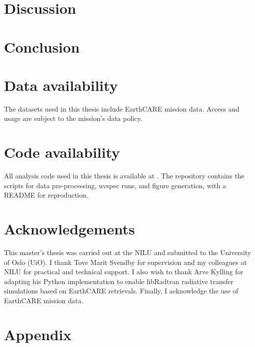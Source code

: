 \documentclass[]{Front_Page_UiO/uiomasterthesis}
\begin{document}
\section{Discussion}
\label{Discussion}


\section{Conclusion}
\label{Conclusion}


\clearpage
{}
\section*{Data availability}
The datasets used in this thesis include EarthCARE mission data. Access and usage are subject to the mission’s data policy.

{}
\section*{Code availability}
All analysis code used in this thesis is available at .
The repository contains the scripts for data pre-processing, uvspec runs, and figure generation, with a README for reproduction. 


{}
\section*{Acknowledgements}
This master’s thesis was carried out at the NILU and submitted to the University of Oslo (UiO). I thank Tove Marit Svendby for supervision and my colleagues at NILU for practical and technical support.
I also wish to thank Arve Kylling for adapting his Python implementation to enable libRadtran radiative transfer simulations based on EarthCARE retrievals. 
Finally, I acknowledge the use of EarthCARE mission data.


\clearpage
\section{Appendix}
\label{Appendix}



\begingroup
  \raggedright
  \footnotesize
                 
\endgroup
\end{document}
